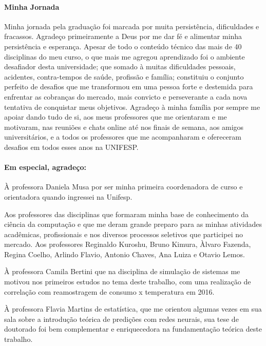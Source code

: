 \documentclass[	12pt, Times, openright, twoside, a4paper, english, brazil]{abntex2}
\begin{document}
    \begin{agradecimentos}
        \paragraph{Minha Jornada}
            Minha jornada pela graduação foi marcada por muita persistência, dificuldades e fracassos. Agradeço primeiramente a Deus por me dar fé e alimentar minha persistência e esperança. Apesar de todo o conteúdo técnico das mais de 40 disciplinas do meu curso, o que mais me agregou aprendizado foi o ambiente desafiador desta universidade; que somado à muitas dificuldades pessoais, acidentes, contra-tempos de saúde, profissão e família; constituiu o conjunto perfeito de desafios que me transformou em uma pessoa forte e destemida para enfrentar as cobranças do mercado, mais convicto e perseverante a cada nova tentativa de conquistar meus objetivos. Agradeço à minha família por sempre me apoiar dando tudo de si, aos meus professores que me orientaram e me motivaram, nas reuniões e chats online até nos finais de semana, aos amigos universitários, e a todos os professores que me acompanharam e ofereceram desafios em todos esses anos na UNIFESP.
        \paragraph{Em especial, agradeço:}
                
            À professora Daniela Musa por ser minha primeira coordenadora de curso e orientadora quando ingressei na Unifesp.\newline
            
            Aos professores das disciplinas que formaram minha base de conhecimento da ciência da computação e que me deram grande preparo para as minhas atividades acadêmicas, profissionais e nos diversos processos seletivos que participei no mercado. Aos professores Reginaldo Kuroshu, Bruno Kimura, Àlvaro Fazenda, Regina Coelho, Arlindo Flavio, Antonio Chaves, Ana Luiza e Otavio Lemos.\newline
            
            À professora Camila Bertini  que na disciplina de simulação de sistemas me motivou nos primeiros estudos no tema deste trabalho, com uma realização de correlação com reamostragem de consumo x temperatura em 2016.\newline
            
            À professora Flavia Martins de estatística, que me orientou algumas vezes em sua sala sobre a introdução teórica de predições com redes neurais, sua tese de doutorado foi bem complementar e enriquecedora na fundamentação teórica deste trabalho.\newline
            

\end{agradecimentos}
\end{document}
